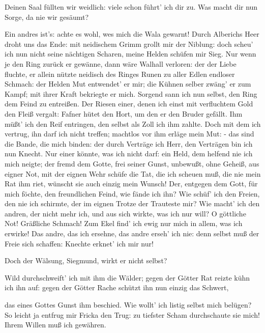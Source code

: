 \begin{drama}
\Brunnhildespeaks
Deinen Saal füllten wir weidlich:
viele schon führt' ich dir zu.
Was macht dir nun Sorge, da nie wir gesäumt?
 

\Wotanspeaks


Ein andres ist's:
achte es wohl, wes mich die Wala gewarnt!
Durch Alberichs Heer
droht uns das Ende:
mit neidischem Grimm grollt mir der Niblung:
doch scheu' ich nun nicht seine nächtigen Scharen,
meine Helden schüfen mir Sieg.
Nur wenn je den Ring
zurück er gewänne,
dann wäre Walhall verloren:
der der Liebe fluchte, er allein
nützte neidisch des Ringes Runen
zu aller Edlen endloser Schmach:
der Helden Mut entwendet' er mir;
die Kühnen selber
zwäng' er zum Kampf;
mit ihrer Kraft bekriegte er mich.
Sorgend sann ich nun selbst,
den Ring dem Feind zu entreißen.
Der Riesen einer, denen ich einst
mit verfluchtem Gold den Fleiß vergalt:
Fafner hütet den Hort,
um den er den Bruder gefällt.
Ihm müßt' ich den Reif entringen,
den selbst als Zoll ich ihm zahlte.
Doch mit dem ich vertrug,
ihn darf ich nicht treffen;
machtlos vor ihm erläge mein Mut: -
das sind die Bande, die mich binden:
der durch Verträge ich Herr,
den Verträgen bin ich nun Knecht.
Nur einer könnte, was ich nicht darf:
ein Held, dem helfend nie ich mich neigte;
der fremd dem Gotte, frei seiner Gunst,
unbewußt, ohne Geheiß,
aus eigner Not, mit der eignen Wehr
schüfe die Tat, die ich scheuen muß,
die nie mein Rat ihm riet,
wünscht sie auch einzig mein Wunsch!
Der, entgegen dem Gott, für mich föchte,
den freundlichen Feind, wie fände ich ihn?
Wie schüf' ich den Freien, den nie ich schirmte,
der im eignen Trotze der Trauteste mir?
Wie macht' ich den andren, der nicht mehr ich,
und aus sich wirkte, was ich nur will?
O göttliche Not! Gräßliche Schmach!
Zum Ekel find' ich ewig nur mich
in allem, was ich erwirke!
Das andre, das ich ersehne,
das andre erseh' ich nie:
denn selbst muß der Freie sich schaffen:
Knechte erknet' ich mir nur!
 

\Brunnhildespeaks
Doch der Wälsung, Siegmund, wirkt er nicht selbst?
 

\Wotanspeaks
Wild durchschweift' ich mit ihm die Wälder;
gegen der Götter Rat reizte kühn ich ihn auf:
gegen der Götter Rache
schützt ihn nun einzig das Schwert,
 



das eines Gottes Gunst ihm beschied.
Wie wollt' ich listig selbst mich belügen?
So leicht ja entfrug mir Fricka den Trug:
zu tiefster Scham durchschaute sie mich!
Ihrem Willen muß ich gewähren.
 


\end{drama}

